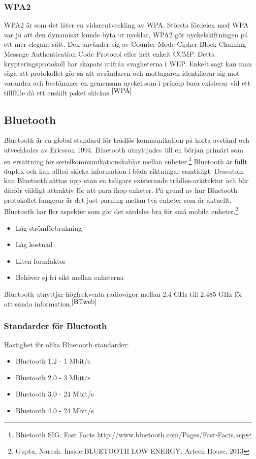 \documentclass[a4paper,12pt,fleqn]{article}
\begin{document}
\subsubsection{WPA2}
WPA2 är som det låter en vidareutveckling av WPA. Största fördelen med WPA var ju att den dynamiskt kunde byta ut nycklar, WPA2 gör nyckelskiftningen på ett mer elegant sätt. Den använder sig av Counter Mode Cipher Block Chaining Message Authentication Code Protocol eller helt enkelt CCMP. Detta krypteringsprotokoll har skapats utifrån svagheterna i WEP. Enkelt sagt kan man säga att protokollet gör så att avsändaren och mottagaren identifierar sig mot varandra och bestämmer en gemensam nyckel som i princip bara existerar vid ett tillfälle då ett enskilt paket skickas.$^{\ref{WPA}}$
\newpage

\subsection{Bluetooth}

Bluetooth är en global standard för trådlös kommunikation på korta avstånd och utvecklades av Ericsson 1994. Bluetooth utnyttjades till en början primärt som en ersättning för serielkommunikationskablar mellan enheter.\footnote{\label{BTweb}Bluetooth SIG. Fast Facts http://www.bluetooth.com/Pages/Fast-Facts.asp}
Bluetooth är fullt duplex och kan alltså skicka information i båda riktningar samtidigt. Dessutom kan Bluetooth sättas upp utan en tidigare existerande trådlös-arkitektur och blir därför väldigt attraktiv för att para ihop enheter. På grund av hur Bluetooth protokollet fungerar är det just parning mellan två enheter som är aktuellt. Bluetooth har fler aspekter som gör det särdeles bra för små mobila enheter.\footnote{\label{Gupta}Gupta, Naresh. Inside BLUETOOTH LOW ENERGY. Artech House, 2013}
\begin{itemize}
\item Låg strömförbrukning 
\item Låg kostnad
\item Liten formfaktor
\item Behöver ej fri sikt mellan enheterna
\end{itemize}

Bluetooth utnyttjar högfrekventa radiovågor mellan 2,4 GHz till 2,485 GHz för att sända information.$^{\ref{BTweb}}$

\subsubsection{Standarder för Bluetooth}
Hastighet för olika Bluetooth standarder:
\begin{itemize}
\item Bluetooth 1.2 - 1 Mbit/s 
\item Bluetooth 2.0 - 3 Mbit/s
\item Bluetooth 3.0 - 24 Mbit/s
\item Bluetooth 4.0 - 24 Mbit/s
\end{itemize}
\end{document}
